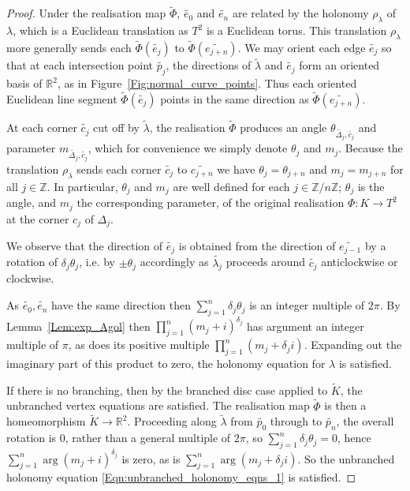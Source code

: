\documentclass[12pt]{amsart}
\numberwithin{equation}{section}
\theoremstyle{named}
\newcommand{\reffig}[1]{Figure~\ref{Fig:#1}}
\newcommand{\refeqn}[1]{\eqref{Eqn:#1}}
\newcommand{\reflem}[1]{Lemma~\ref{Lem:#1}}
\newcommand{\R}{\mathbb{R}}
\newcommand{\Z}{\mathbb{Z}}
\newcommand{\To}{\longrightarrow}
\begin{document}
\begin{proof}
Under the realisation map $\widetilde{\Phi}$, $\widetilde{e_0}$ and $\widetilde{e_n}$ are related by the holonomy $\rho_\lambda$ of $\lambda$, which is a Euclidean translation as $T^2$ is a Euclidean torus. This translation $\rho_\lambda$ more generally sends each $\widetilde{\Phi}(\widetilde{e_j})$ to $\widetilde{\Phi}(\widetilde{e_{j+n}})$. We may orient each edge $\widetilde{e_j}$ so that at each intersection point $\widetilde{p_j}$, the directions of $\widetilde{\lambda}$ and $\widetilde{e_j}$ form an oriented basis of $\R^2$, as in \reffig{normal_curve_points}. Thus each oriented Euclidean line segment $\widetilde{\Phi}(\widetilde{e_j})$ points in the same direction as $\widetilde{\Phi}(\widetilde{e_{j+n}})$.

At each corner $\widetilde{c_j}$ cut off by $\widetilde{\lambda}$, the realisation $\widetilde{\Phi}$ produces an angle $\theta_{\widetilde{\Delta_j},\widetilde{c_j}}$ and parameter $m_{\widetilde{\Delta_j},\widetilde{c_j}}$, which for convenience we simply denote $\theta_j$ and $m_j$. Because the translation $\rho_\lambda$ sends each corner $\widetilde{c_j}$ to $\widetilde{c_{j+n}}$ we have $\theta_j = \theta_{j+n}$ and $m_j = m_{j+n}$ for all $j \in \Z$. In particular, $\theta_j$ and $m_j$ are well defined for each $j \in \Z/n\Z$; $\theta_j$ is the angle, and $m_j$ the corresponding parameter, of the original realisation $\Phi \colon K \To T^2$ at the corner $c_j$ of $\Delta_j$.

We observe that the direction of $\widetilde{e_j}$ is obtained from the direction of $\widetilde{e_{j-1}}$ by a rotation of $\delta_j \theta_j$, i.e. by $\pm \theta_j$ accordingly as $\widetilde{\lambda_j}$ proceeds around $\widetilde{c_j}$ anticlockwise or clockwise.

As $\widetilde{e_0}, \widetilde{e_{n}}$ have the same direction then $\sum_{j=1}^{n} \delta_j \theta_j$ is an integer multiple of $2\pi$. By \reflem{exp_Agol} then $\prod_{j=1}^{n} \left( m_j + i \right)^{\delta_j}$ has argument an integer multiple of $\pi$, as does its positive multiple $\prod_{j=1}^{n} \left( m_j + \delta_j i \right)$. Expanding out the imaginary part of this product to zero, the holonomy equation for $\lambda$ is satisfied.

If there is no branching, then by the branched disc case applied to $\widetilde{K}$, the unbranched vertex equations are satisfied. The realisation map $\widetilde{\Phi}$ is then a homeomorphism $\widetilde{K} \To \R^2$. Proceeding along $\widetilde{\lambda}$ from $\widetilde{p_0}$ through to $\widetilde{p_{n}}$, the overall rotation is $0$, rather than a general multiple of $2\pi$, so $\sum_{j=1}^{n} \delta_j \theta_j = 0$, hence $\sum_{j=1}^{n} \arg \left(m_j + i \right)^{\delta_j}$ is zero, as is $\sum_{j=1}^{n} \arg \left( m_j + \delta_j i \right)$. So the unbranched holonomy equation \refeqn{unbranched_holonomy_eqns_1} is satisfied.
\end{proof}
\end{document}
